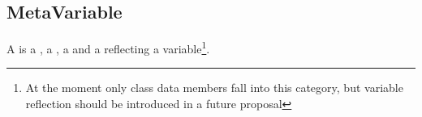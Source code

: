 \subsection{MetaVariable}
\label{concept-MetaVariable}

A  is a , a , a  and a 
reflecting a variable\footnote{At the moment only class data members fall
into this category, but variable reflection should be introduced in a future
proposal}.




